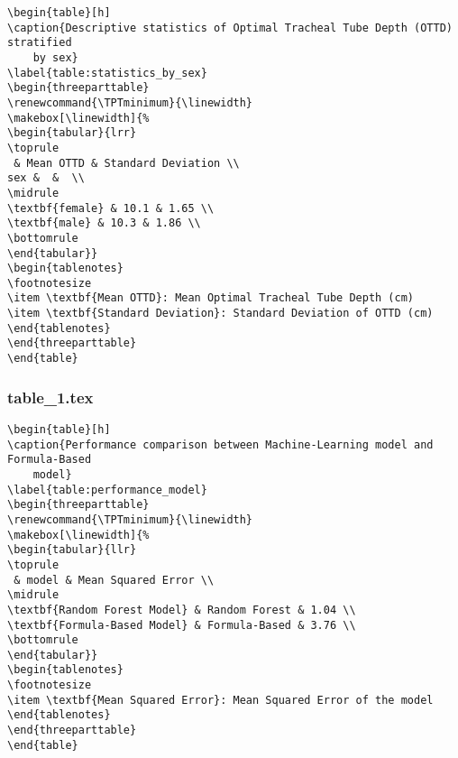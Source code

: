 \documentclass[11pt]{article}
\begin{document}
\begin{Verbatim}[tabsize=4]
\begin{table}[h]
\caption{Descriptive statistics of Optimal Tracheal Tube Depth (OTTD) stratified
	by sex}
\label{table:statistics_by_sex}
\begin{threeparttable}
\renewcommand{\TPTminimum}{\linewidth}
\makebox[\linewidth]{%
\begin{tabular}{lrr}
\toprule
 & Mean OTTD & Standard Deviation \\
sex &  &  \\
\midrule
\textbf{female} & 10.1 & 1.65 \\
\textbf{male} & 10.3 & 1.86 \\
\bottomrule
\end{tabular}}
\begin{tablenotes}
\footnotesize
\item \textbf{Mean OTTD}: Mean Optimal Tracheal Tube Depth (cm)
\item \textbf{Standard Deviation}: Standard Deviation of OTTD (cm)
\end{tablenotes}
\end{threeparttable}
\end{table}

\end{Verbatim}

\subsubsection*{table\_1.tex}

\begin{Verbatim}[tabsize=4]
\begin{table}[h]
\caption{Performance comparison between Machine-Learning model and Formula-Based
	model}
\label{table:performance_model}
\begin{threeparttable}
\renewcommand{\TPTminimum}{\linewidth}
\makebox[\linewidth]{%
\begin{tabular}{llr}
\toprule
 & model & Mean Squared Error \\
\midrule
\textbf{Random Forest Model} & Random Forest & 1.04 \\
\textbf{Formula-Based Model} & Formula-Based & 3.76 \\
\bottomrule
\end{tabular}}
\begin{tablenotes}
\footnotesize
\item \textbf{Mean Squared Error}: Mean Squared Error of the model
\end{tablenotes}
\end{threeparttable}
\end{table}

\end{Verbatim}
\end{document}
